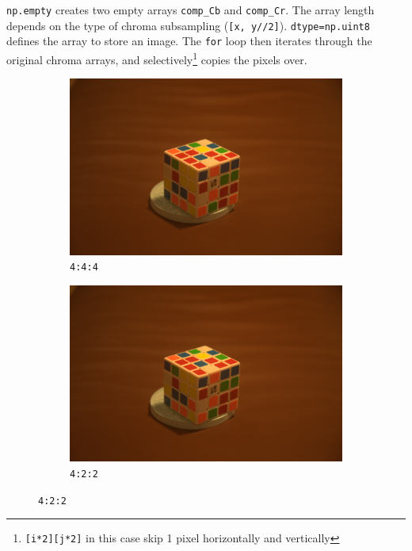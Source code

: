 \documentclass{article}
\begin{document}
\texttt{np.empty} creates two empty arrays \texttt{comp\_Cb} and \texttt{comp\_Cr}.
The array length depends on the type of chroma subsampling (\texttt{[x, y//2]}).
\texttt{dtype=np.uint8} defines the array to store an image.
The \texttt{for} loop then iterates through the original chroma arrays, and selectively\footnote{\texttt{[i*2][j*2]} in this case skip 1 pixel horizontally and vertically} copies the pixels over.

\begin{figure}[h!]
\centering
\begin{subfigure}[b]{0.4\textwidth}
\caption{\texttt{4:4:4}}
\begin{center}
	\includegraphics[width=\textwidth]{./implementation/experiment/out.png}
\end{center}
\end{subfigure}%
\begin{subfigure}[b]{0.4\textwidth}
\caption{\texttt{4:2:2}}
\begin{center}
	\includegraphics[width=\textwidth]{./implementation/experiment/422.png}

\end{center}
\end{subfigure}
\end{figure}
\end{document}
